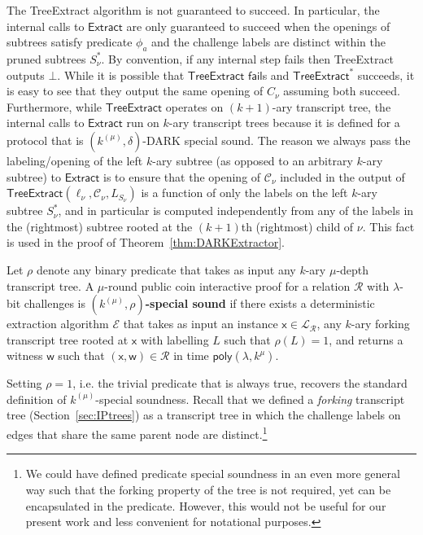 The \textsf{TreeExtract} algorithm is not guaranteed to succeed. In particular, the internal calls to $\textsf{Extract}$ are only guaranteed to succeed when the openings of subtrees satisfy predicate $\phi_a$ and the challenge labels are distinct within the pruned subtrees $S^*_\nu$. By convention, if any internal step fails then \textsf{TreeExtract} outputs $\bot$. While it is possible that $\textsf{TreeExtract}$ $\mathsf{fail}$s and $\textsf{TreeExtract}^*$ succeeds, it is easy to see that they output the same opening of $C_\nu$ assuming both succeed. Furthermore, while $\textsf{TreeExtract}$ operates on $(k+1)$-ary transcript tree, the internal calls to $\textsf{Extract}$ run on $k$-ary transcript trees because it is defined for a protocol that is $(k^{(\mu)}, \delta)$-DARK special sound. The reason we always pass the labeling/opening of the left $k$-ary subtree (as opposed to an arbitrary $k$-ary subtree) to $\textsf{Extract}$ is to ensure that the opening of $\mathcal{C}_\nu$ included in the output of $\textsf{TreeExtract}(\ell_\nu, \mathcal{C}_\nu, L_{S_\nu})$ is a function of only the labels on the left $k$-ary subtree $S^*_\nu$, and in particular is computed independently from any of the labels in the (rightmost) subtree rooted at the $(k+1)$th (rightmost) child of $\nu$. This fact is used in the proof of Theorem~\ref{thm:DARKExtractor}.

\begin{definition}
	Let $\rho$ denote any binary predicate that takes as input any $k$-ary $\mu$-depth transcript tree. A $\mu$-round public coin interactive proof for a relation $\mathcal{R}$ with $\lambda$-bit challenges is \textbf{$(k^{(\mu)}, \rho)$-special sound} if there exists a deterministic extraction algorithm $\mathcal{E}$ that takes as input an instance $\mathsf{x} \in \mathcal{L}_\mathcal{R}$, any $k$-ary forking transcript tree rooted at $\mathsf{x}$ with labelling $L$ such that $\rho(L) = 1$, and returns a witness $\mathsf{w}$ such that $(\mathsf{x}, \mathsf{w}) \in \mathcal{R}$ in time $\textsf{poly}(\lambda, k^\mu)$. 
\end{definition}

Setting $\rho = 1$, i.e. the trivial predicate that is always true, recovers the standard definition of $k^{(\mu)}$-special soundness. Recall that we defined a \emph{forking} transcript tree (Section~\ref{sec:IPtrees}) as a transcript tree in which the challenge labels on edges that share the same parent node are distinct.\footnote{We could have defined predicate special soundness in an even more general way such that the forking property of the tree is not required, yet can be encapsulated in the predicate. However, this would not be useful for our present work and less convenient for notational purposes.} 


